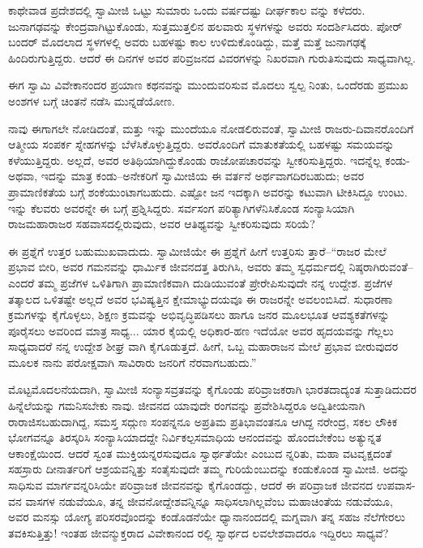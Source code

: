 ಕಾಥೇವಾಡ ಪ್ರದೇಶದಲ್ಲಿ ಸ್ವಾಮೀಜಿ ಒಟ್ಟು ಸುಮಾರು ಒಂದು ವರ್ಷದಷ್ಟು ದೀರ್ಘಕಾಲ ವನ್ನು ಕಳೆದರು. ಜುನಾಗಢವನ್ನು ಕೇಂದ್ರವಾಗಿಟ್ಟುಕೊಂಡು, ಸುತ್ತಮುತ್ತಲಿನ ಹಲವಾರು ಸ್ಥಳಗಳನ್ನು ಅವರು ಸಂದರ್ಶಿಸಿದರು. ಪೋರ್​ಬಂದರ್ ಮೊದಲಾದ ಸ್ಥಳಗಳಲ್ಲಿ ಅವರು ಬಹಳಷ್ಟು ಕಾಲ ಉಳಿದುಕೊಂಡಿದ್ದು, ಮತ್ತೆ ಮತ್ತೆ ಜುನಾಗಢಕ್ಕೆ ಹಿಂದಿರುಗುತ್ತಿದ್ದರು. ಆದರೆ ಈ ದಿನಗಳ ಅವರ ಪರಿವ್ರಜನದ ವಿವರಗಳನ್ನು ನಿಖರವಾಗಿ ಗುರುತಿಸುವುದು ಸಾಧ್ಯವಾಗಿಲ್ಲ.

ಈಗ ಸ್ವಾಮಿ ವಿವೇಕಾನಂದರ ಪ್ರಯಾಣ ಕಥನವನ್ನು ಮುಂದುವರಿಸುವ ಮೊದಲು ಸ್ವಲ್ಪ ನಿಂತು, ಒಂದೆರಡು ಪ್ರಮುಖ ಅಂಶಗಳ ಬಗ್ಗೆ ಚಿಂತನೆ ನಡೆಸಿ ಮುನ್ನಡೆಯೋಣ.

ನಾವು ಈಗಾಗಲೇ ನೋಡಿದಂತೆ, ಮತ್ತು ಇನ್ನು ಮುಂದೆಯೂ ನೋಡಲಿರುವಂತೆ, ಸ್ವಾಮೀಜಿ ರಾಜರು-ದಿವಾನರೊಂದಿಗೆ ಆತ್ಮೀಯ ಸಂಪರ್ಕ ಸ್ನೇಹಗಳನ್ನು ಬೆಳೆಸಿಕೊಳ್ಳುತ್ತಿದ್ದರು. ಅವರೊಂದಿಗೆ ಮಾತುಕತೆಯಲ್ಲಿ ಬಹಳಷ್ಟು ಸಮಯವನ್ನು ಕಳೆಯುತ್ತಿದ್ದರು. ಅಲ್ಲದೆ, ಅವರ ಅತಿಥಿಯಾಗಿದ್ದುಕೊಂಡು ರಾಜೋಪಚಾರವನ್ನು ಸ್ವೀಕರಿಸುತ್ತಿದ್ದರು. ಇದನ್ನೆಲ್ಲ ಕಂಡು-ಅಥವಾ, ಇದನ್ನು ಮಾತ್ರ ಕಂಡು–ಅನೇಕರಿಗೆ ಸ್ವಾಮೀಜಿಯ ಈ ವರ್ತನೆ ಅರ್ಥವಾಗದಿರಬಹುದು; ಅವರ ಪ್ರಾಮಾಣಿಕತೆಯ ಬಗ್ಗೆ ಶಂಕೆಯುಂಟಾಗಬಹುದು. ಎಷ್ಟೋ ಜನ ಇದಕ್ಕಾಗಿ ಅವರನ್ನು ಕಟುವಾಗಿ ಟೀಕಿಸಿದ್ದೂ ಉಂಟು. ಇನ್ನು ಕೆಲವರು ಅವರನ್ನೇ ಈ ಬಗ್ಗೆ ಪ್ರಶ್ನಿಸಿದ್ದರು. ಸರ್ವಸಂಗ ಪರಿತ್ಯಾಗಿಗಳೆನಿಸಿಕೊಂಡ ಸಂನ್ಯಾಸಿಯಾಗಿ ರಾಜಮಹಾರಾಜರ ಸಹವಾಸದಲ್ಲಿರುವುದು, ಅವರ ಆತಿಥ್ಯವನ್ನು ಸ್ವೀಕರಿಸುವುದು ಸರಿಯೆ?

ಈ ಪ್ರಶ್ನೆಗೆ ಉತ್ತರ ಬಹುಮುಖವಾದುದು. ಸ್ವಾಮೀಜಿಯೇ ಈ ಪ್ರಶ್ನೆಗೆ ಹೀಗೆ ಉತ್ತರಿಸು ತ್ತಾರೆ–“ರಾಜರ ಮೇಲೆ ಪ್ರಭಾವ ಬೀರಿ, ಅವರ ಗಮನವನ್ನು ಧಾರ್ಮಿಕ ಜೀವನದತ್ತ ತಿರುಗಿಸಿ, ಅವರು ತಮ್ಮ ಸ್ವಧರ್ಮದಲ್ಲಿ ನಿಷ್ಠರಾಗಿರುವಂತೆ–ಎಂದರೆ ತಮ್ಮ ಪ್ರಜೆಗಳ ಒಳಿತಿಗಾಗಿ ಪ್ರಾಮಾಣಿಕವಾಗಿ ದುಡಿಯುವಂತೆ ಪ್ರೇರೇಪಿಸುವುದೇ ನನ್ನ ಉದ್ದೇಶ. ಪ್ರಜೆಗಳ ತತ್ಕಾಲದ ಒಳಿತಷ್ಟೇ ಅಲ್ಲದೆ ಅವರ ಭವಿಷ್ಯತ್ತಿನ ಕ್ಷೇಮಾಭ್ಯುದಯವೂ ಈ ರಾಜರನ್ನೇ ಅವಲಂಬಿಸಿದೆ. ಸುಧಾರಣಾ ಕ್ರಮಗಳನ್ನು ಕೈಗೊಳ್ಳಲು, ಶಿಕ್ಷಣ ಕ್ರಮವನ್ನು ಅಭಿವೃದ್ಧಿಪಡಿಸಲು ಹಾಗೂ ಜನರ ಮೂಲಭೂತ ಆವಶ್ಯಕತೆಗಳನ್ನು ಪೂರೈಸಲು ಅವರಿಂದ ಮಾತ್ರ ಸಾಧ್ಯ... ಯಾರ ಕೈಯಲ್ಲಿ ಅಧಿಕಾರ-ಹಣ ಇದೆಯೋ ಅವರ ಹೃದಯವನ್ನು ಗೆಲ್ಲಲು ಸಾಧ್ಯವಾದರೆ ನನ್ನ ಉದ್ದೇಶ ಶೀಘ್ರ ವಾಗಿ ಕೈಗೂಡುತ್ತದೆ. ಹೀಗೆ, ಒಬ್ಬ ಮಹಾರಾಜನ ಮೇಲೆ ಪ್ರಭಾವ ಬೀರುವುದರ ಮೂಲಕ ನಾನು ಪರೋಕ್ಷವಾಗಿ ಸಾವಿರಾರು ಜನರಿಗೆ ನೆರವಾಗಬಹುದು.”

ಮೊಟ್ಟಮೊದಲನೆಯದಾಗಿ, ಸ್ವಾಮೀಜಿ ಸಂನ್ಯಾಸವ್ರತವನ್ನು ಕೈಗೊಂಡು ಪರಿವ್ರಾಜಕರಾಗಿ ಭಾರತದಾದ್ಯಂತ ಸುತ್ತಾಡಿದುದರ ಹಿನ್ನೆಲೆಯನ್ನು ಗಮನಿಸಬೇಕು ನಾವು. ಜೀವನದ ಯಾವುದೇ ರಂಗವನ್ನು ಪ್ರವೇಶಿಸಿದ್ದರೂ ಅದ್ವಿತೀಯನಾಗಿ ರಾರಾಜಿಸಬಹುದಾಗಿದ್ದ, ಸಮಸ್ತ ಸದ್ಗುಣ ಸಂಪನ್ನನೂ ಅಪ್ರತಿಮ ಪ್ರತಿಭಾವಂತನೂ ಆಗಿದ್ದ ನರೇಂದ್ರ, ಸಕಲ ಲೌಕಿಕ ಭೋಗವನ್ನೂ ತಿರಸ್ಕರಿಸಿ ಸಂನ್ಯಾಸಿಯಾದದ್ದೇ ನಿರ್ವಿಕಲ್ಪಸಮಾಧಿಯ ಆನಂದವನ್ನು ಹೊಂದಬೇಕೆಂಬ ಅತ್ಯುನ್ನತ ಆಕಾಂಕ್ಷೆಯಿಂದ. ಆದರೆ ಸ್ವಂತ ಮುಕ್ತಿಯನ್ನರಸುವುದೂ ಸ್ವಾರ್ಥತೆಯೇ ಎಂಬುದ ನ್ನರಿತು, ಮಹಾ ವಟವೃಕ್ಷದಂತೆ ಸಹಸ್ರಾರು ದೀನಾರ್ತರಿಗೆ ಆಶ್ರಯವನ್ನಿತ್ತು ಸಂತೈಸುವುದೇ ತಮ್ಮ ಗುರಿಯೆಂಬುದನ್ನು ಕಂಡುಕೊಂಡ ಸ್ವಾಮೀಜಿ. ಅದನ್ನು ಸಾಧಿಸುವ ಮಾರ್ಗವನ್ನರಿಸಿಯೇ ಪರಿವ್ರಾಜಕ ಜೀವನವನ್ನು ಕೈಗೊಂಡದ್ದು, ಆದರೆ ಈ ಪರಿವ್ರಾಜಕ ಜೀವನದ ಉಪವಾಸ-ವನ ವಾಸಗಳ ನಡುವೆಯೂ, ತನ್ನ ಜೀವನೋದ್ದೇಶವನ್ನಿನ್ನೂ ಸಾಧಿಸಲಾಗಿಲ್ಲವೆಂಬ ಮಹಾಚಿಂತೆಯ ನಡುವೆಯೂ, ಅವರ ಮನಸ್ಸು ಯೋಗ್ಯ ಪರಿಸರವೊಂದನ್ನು ಕಂಡೊಡನೆಯೇ ಧ್ಯಾನಾನಂದದಲ್ಲಿ ಮಗ್ನವಾಗಿ ತನ್ನ ಸಹಜ ನೆಲೆಗೇರಲು ತವಕಿಸುತ್ತಿತ್ತು! ಇಂತಹ ಜೀವನ್ಮುಕ್ತರಾದ ವಿವೇಕಾನಂದ ರಲ್ಲಿ ಸ್ವಾರ್ಥದ ಲವಲೇಶವಾದರೂ ಇದ್ದಿರಲು ಸಾಧ್ಯವೆ?

